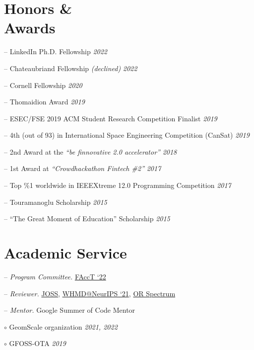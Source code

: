 \documentclass[margin]{res}
\begin{document}
\begin{resume}
\section{Honors \& \\ Awards} 
\begin{compactitem}
	\item[--] LinkedIn Ph.D. Fellowship \hfill \emph{2022} 	\item[--] Chateaubriand Fellowship \emph{(declined)} \hfill \emph{2022}
	\item[--] Cornell Fellowship \hfill \emph{2020}
	\item[--] Thomaidion Award \hfill \emph{2019}
	\item[--] ESEC/FSE 2019 ACM Student Research Competition Finalist \hfill \emph{2019}

	\item[--] 4th (out of 93) in International Space Engineering  Competition (CanSat) \hfill \emph{2019}
    \item[--] 2nd Award at the \emph{``be finnovative 2.0 accelerator''} \hfill \emph{2018}
   	\item[--] 1st Award at \emph{``Crowdhackathon Fintech \#2''} \hfill \emph{2017}
   	\item[--] Top \%1 worldwide in IEEEXtreme 12.0 Programming Competition \hfill \emph{2017}
    \item [--] Touramanoglu Scholarship \hfill \emph{2015}
    \item [--] ``The Great Moment of Education'' Scholarship \hfill \emph{2015}

\end{compactitem}

\section{Academic Service} 
\begin{compactitem}

\item [--] \emph{Program Committee.} \href{https://facctconference.org/2022}{FAccT `22}
\item [--] \emph{Reviewer.} \href{https://joss.theoj.org/}{JOSS}, \href{https://sites.google.com/view/whmd2021}{WHMD@NeurIPS `21},  \href{https://www.springer.com/journal/291?gclid=Cj0KCQiAr5iQBhCsARIsAPcwROPwkZ2Nw4Ubg7i91Y2hITU4OE4lzk_56F09IS09b5wh-sMhuqgft0YaAgATEALw_wcB}{OR Spectrum}
\item [--] \emph{Mentor.} Google Summer of Code Mentor
\begin{compactitem}
	\item [$\circ$] GeomScale organization \hfill \emph{2021, 2022}
	\item [$\circ$] GFOSS-OTA \hfill \emph{2019}
 \end{compactitem}

\end{compactitem}

\end{resume}
\end{document}
